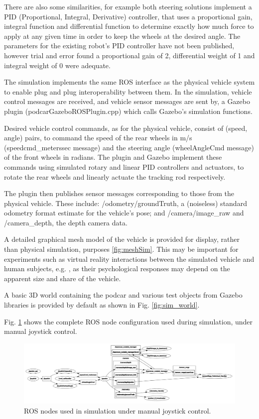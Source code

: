 \documentclass[a4paper]{article}
\begin{document}
There are also some similarities, for example both steering solutions implement a PID
(Proportional, Integral, Derivative) controller, that uses a proportional gain, integral function
and differential function to determine exactly how much force to apply at any given time in
order to keep the wheels at the desired angle. The parameters for the existing robot’s PID
controller have not been published, however trial and error found a proportional gain of 2,
differential weight of 1 and integral weight of 0 were adequate.

The simulation implements the same ROS interface as the physical vehicle system to enable plug and plug interoperability between them.  In the simulation, vehicle control messages are received, and vehicle sensor messages are sent by, a Gazebo plugin (podcarGazeboROSPlugin.cpp) which calls Gazebo’s simulation functions.  

Desired vehicle control commands, as for the physical vehicle, consist of (speed, angle) pairs, to command the speed of the rear wheels in m/s (speedcmd\_meterssec message) and the steering angle (wheelAngleCmd message) of the front wheels in radians.  The plugin and Gazebo implement these commands using simulated rotary and linear PID controllers and actuators, to rotate the rear wheels and linearly actuate the tracking rod respectively.

The plugin then publishes sensor messages corresponding to those from the physical vehicle. These include:  /odometry/groundTruth, a (noiseless) standard odometry format estimate for the vehicle’s pose; and /camera/image\_raw and /camera\_depth, the depth camera data.

A detailed graphical mesh model of the vehicle is provided for display, rather than physical simulation, purposes \ref{fig:meshSim}.  This may be important for experiments such as virtual reality interactions between the simulated vehicle and human subjects, e.g. \cite{camara2021evaluating}, as their psychological responses may depend on the apparent size and share of the vehicle.

A basic 3D world containing the podcar and various test objects from Gazebo libraries is provided by default as shown in Fig. \ref{fig:sim_world}.

Fig. \ref{fig:sim_nodes} shows the complete ROS node configuration used during simulation, under manual joystick control.  
\begin{figure}[h]
	\includegraphics[width=\columnwidth]{figs_sim/sim_nodes.png}
	\caption{ROS nodes used in simulation under manual joystick control.}
	\label{fig:sim_nodes}
\end{figure}
\end{document}
